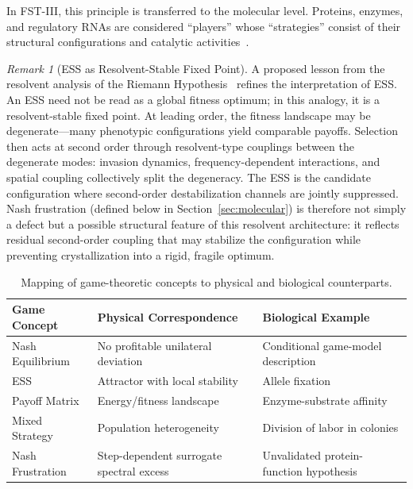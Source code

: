 \documentclass[12pt,a4paper]{article}
\theoremstyle{remark}
\newtheorem{remark}{Remark}
\begin{document}
In FST-III, this principle is transferred to the molecular level. Proteins, enzymes, and regulatory RNAs are considered ``players'' whose ``strategies'' consist of their structural configurations and catalytic activities~\citep{GameBiochemistry}.

\begin{remark}[ESS as Resolvent-Stable Fixed Point]
\label{rem:ess-resolvent}
A proposed lesson from the resolvent analysis of the Riemann Hypothesis~\citep{GeigerRH2026b} refines the interpretation of ESS. An ESS need not be read as a global fitness optimum; in this analogy, it is a resolvent-stable fixed point. At leading order, the fitness landscape may be degenerate---many phenotypic configurations yield comparable payoffs. Selection then acts at second order through resolvent-type couplings between the degenerate modes: invasion dynamics, frequency-dependent interactions, and spatial coupling collectively split the degeneracy. The ESS is the candidate configuration where second-order destabilization channels are jointly suppressed. Nash frustration (defined below in Section~\ref{sec:molecular}) is therefore not simply a defect but a possible structural feature of this resolvent architecture: it reflects residual second-order coupling that may stabilize the configuration while preventing crystallization into a rigid, fragile optimum.
\end{remark}

\begin{table}[htbp]
\centering
\caption{Mapping of game-theoretic concepts to physical and biological counterparts.}
\label{tab:game-biology-mapping}
\begin{tabularx}{\textwidth}{@{}L{0.18\textwidth} L{0.29\textwidth} Y@{}}
\toprule
\textbf{Game Concept} & \textbf{Physical Correspondence} & \textbf{Biological Example} \\
\midrule
Nash Equilibrium & No profitable unilateral deviation & Conditional game-model description \\
ESS & Attractor with local stability & Allele fixation \\
Payoff Matrix & Energy/fitness landscape & Enzyme-substrate affinity \\
Mixed Strategy & Population heterogeneity & Division of labor in colonies \\
Nash Frustration & Step-dependent surrogate spectral excess & Unvalidated protein-function hypothesis \\
\bottomrule
\end{tabularx}
\end{table}
\end{document}
